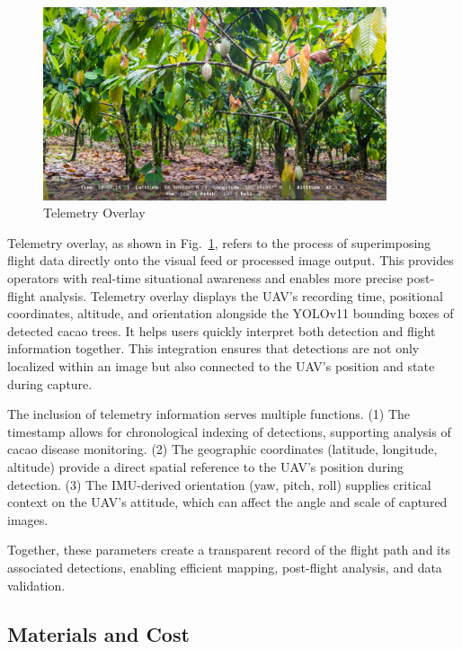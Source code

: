 \begin{figure}[H]
	\centering
	\caption{Telemetry Overlay}
	\label{fig:telemetry_overlay}
	\includegraphics[width=0.9\textwidth]{figures/Telemetry.pdf}
\end{figure}

Telemetry overlay, as shown in Fig.~\ref{fig:telemetry_overlay}, refers to the process of superimposing flight data directly onto the visual feed or processed image output. This provides operators with real-time situational awareness and enables more precise post-flight analysis. Telemetry overlay displays the UAV’s recording time, positional coordinates, altitude, and orientation alongside the YOLOv11 bounding boxes of detected cacao trees. It helps users quickly interpret both detection and flight information together. This integration ensures that detections are not only localized within an image but also connected to the UAV’s position and state during capture.



The inclusion of telemetry information serves multiple functions.
(1) The timestamp allows for chronological indexing of detections, supporting analysis of cacao disease monitoring.
(2) The geographic coordinates (latitude, longitude, altitude) provide a direct spatial reference to the UAV’s position during detection.
(3) The IMU-derived orientation (yaw, pitch, roll) supplies critical context on the UAV’s attitude, which can affect the angle and scale of captured images.

Together, these parameters create a transparent record of the flight path and its associated detections, enabling efficient mapping, post-flight analysis, and data validation.

\subsection{Materials and Cost}

